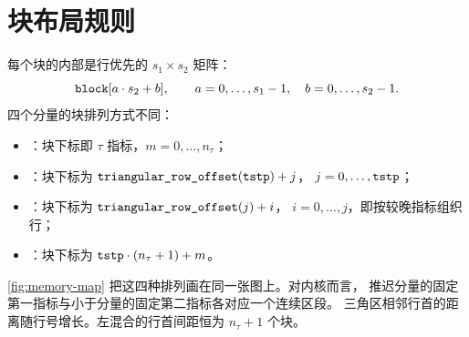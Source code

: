 \section{块布局规则}
\label{sec:block-layout}

每个块的内部是行优先的 $s_1\times s_2$ 矩阵：
\begin{equation}
    \code{block}[a\cdot s_2 + b],
    \qquad a=0,\dots,s_1-1,\quad b=0,\dots,s_2-1 .
\end{equation}
四个分量的块排列方式不同：
\begin{itemize}
    \item {}：块下标即 $\tau$ 指标，$m=0,\dots,n_\tau$；
    \item {}：块下标为 $\code{triangular_row_offset}(\tstp)+j$，
          $j=0,\dots,\texttt{tstp}$；
    \item {}：块下标为 $\code{triangular_row_offset}(j)+i$，
          $i=0,\dots,j$，即按较晚指标组织行；
    \item {}：块下标为 $\texttt{tstp}\cdot(n_\tau+1)+m$。
\end{itemize}

\cref{fig:memory-map} 把这四种排列画在同一张图上。对内核而言，
推迟分量的固定第一指标与小于分量的固定第二指标各对应一个连续区段。
三角区相邻行首的距离随行号增长。左混合的行首间距恒为 $n_\tau+1$ 个块。

